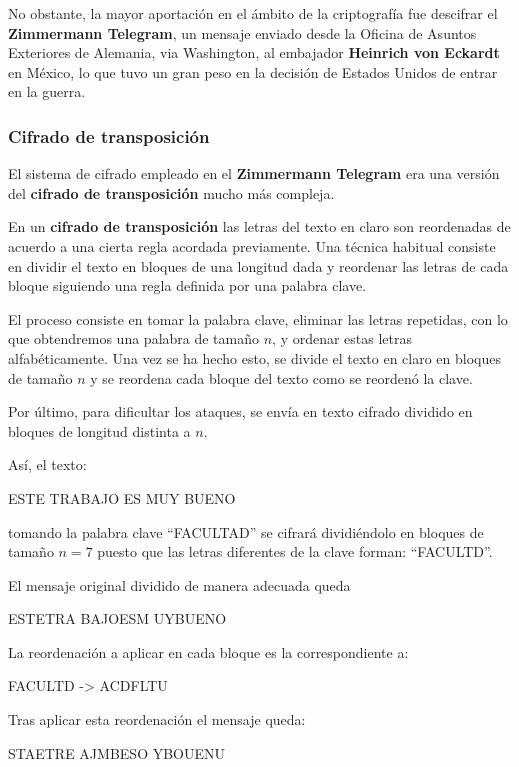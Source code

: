 \documentclass[nochap]{apuntesURJC}
\begin{document}
No obstante, la mayor aportación en el ámbito de la criptografía fue descifrar el \textbf{Zimmermann Telegram}, un mensaje enviado desde la Oficina de Asuntos Exteriores de Alemania, via Washington, al embajador \textbf{Heinrich von Eckardt} en México, lo que tuvo un gran peso en la decisión de Estados Unidos de entrar en la guerra.

\subsubsection{Cifrado de transposición}
El sistema de cifrado empleado en el \textbf{Zimmermann Telegram} era una versión del \textbf{cifrado de transposición} mucho más compleja.

En un \textbf{cifrado de transposición} las letras del texto en claro son reordenadas de acuerdo a una cierta regla acordada previamente. Una técnica habitual consiste en dividir el texto en bloques de una longitud dada y reordenar las letras de cada bloque siguiendo una regla definida por una palabra clave.

El proceso consiste en tomar la palabra clave, eliminar las letras repetidas, con lo que obtendremos una palabra de tamaño $n$, y ordenar estas letras alfabéticamente. Una vez se ha hecho esto, se divide el texto en claro en bloques de tamaño $n$ y se reordena cada bloque del texto como se reordenó la clave.

Por último, para dificultar los ataques, se envía en texto cifrado dividido en bloques de longitud distinta a $n$.

Así, el texto:
\begin{center}
ESTE TRABAJO ES MUY BUENO
\end{center}
tomando la palabra clave ``FACULTAD'' se cifrará dividiéndolo en bloques de tamaño $n=7$ puesto que las letras diferentes de la clave forman: ``FACULTD''.

El mensaje original dividido de manera adecuada queda
\begin{center}
ESTETRA BAJOESM UYBUENO
\end{center}

La reordenación a aplicar en cada bloque es la correspondiente a:
\begin{center}
FACULTD -> ACDFLTU
\end{center}

Tras aplicar esta reordenación el mensaje queda:
\begin{center}
STAETRE AJMBESO YBOUENU
\end{center}
\end{document}
